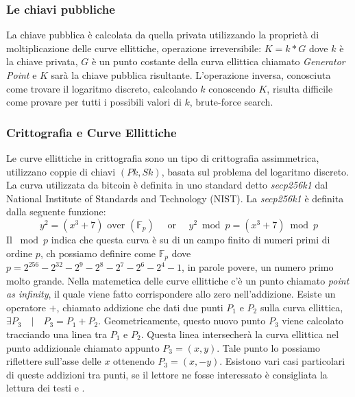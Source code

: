 \subsubsection{Le chiavi pubbliche}
La chiave pubblica è calcolata da quella privata utilizzando la proprietà di moltiplicazione delle curve ellittiche, operazione irreversibile: $K=k*G$ dove $k$ è la chiave privata, $G$ è un punto costante della curva ellittica chiamato \textit{Generator Point} e $K$ sarà la chiave pubblica risultante. L'operazione inversa, conosciuta come trovare il logaritmo discreto, calcolando $k$ conoscendo $K$, risulta difficile come provare per tutti i possibili valori di $k$, brute-force search.

\subsubsection{Crittografia e Curve Ellittiche}
Le curve ellittiche in crittografia sono un tipo di crittografia assimmetrica, utilizzano coppie di chiavi $(Pk, Sk)$, basata sul problema del logaritmo discreto. La curva utilizzata da bitcoin è definita in uno standard detto \textit{secp256k1} dal National Institute of Standards and Technology (NIST). La \textit{secp256k1} è definita dalla seguente funzione:
\[  y^{2}=(x^{3}+7) \text{ over } (\mathbb{F}_{p}) \quad \text{ or } \quad y^{2} \bmod p=(x^{3}+7) \bmod p\]
Il $\bmod p$ indica che questa curva è su di un campo finito di numeri primi di ordine $p$, ch possiamo definire come $\mathbb{F}_{p}$ dove $p = 2^{256} - 2^{32} - 2^{9} - 2^{8} - 2^{7} - 2^{6} - 2^{4} - 1$, in parole povere, un numero primo molto grande.
Nella matemetica delle curve ellittiche c'è un punto chiamato \textit{point as infinity}, il quale viene fatto corrispondere allo zero nell'addizione.
Esiste un operatore $+$, chiamato addizione che dati due punti $P_{1}$ e $P_{2}$ sulla curva ellittica, $\exists P_{3} \quad | \quad P_{3} = P_{1} + P_{2}$. Geometricamente, questo nuovo punto $P_{3}$ viene calcolato tracciando una linea tra $P_{1}$ e $P_{2}$. Questa linea intersecherà la curva ellittica nel punto addizionale chiamato appunto $P_{3} = (x, y)$. Tale punto lo possiamo riflettere sull'asse delle $x$ ottenendo $P_{3} = (x, -y)$. Esistono vari casi particolari di queste addizioni tra punti, se il lettore ne fosse interessato è consigliata la lettura dei testi \cite{mastering:andreas} e \cite{mastering2:andreas}.

